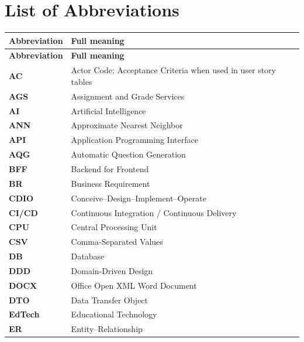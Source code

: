 \chapter*{List of Abbreviations}
{}

\begin{longtable}{|p{3.5cm}|p{11cm}|}
    \hline
    \textbf{Abbreviation} & \textbf{Full meaning} \\
    \hline
    \endfirsthead
    \hline
    \textbf{Abbreviation} & \textbf{Full meaning} \\
    \hline
    \endhead

    \textbf{AC}      & Actor Code; Acceptance Criteria when used in user story tables \\
    \hline
    \textbf{AGS}     & Assignment and Grade Services \\
    \hline
    \textbf{AI}      & Artificial Intelligence \\
    \hline
    \textbf{ANN}     & Approximate Nearest Neighbor \\
    \hline
    \textbf{API}     & Application Programming Interface \\
    \hline
    \textbf{AQG}     & Automatic Question Generation \\
    \hline
    \textbf{BFF}     & Backend for Frontend \\
    \hline
    \textbf{BR}      & Business Requirement \\
    \hline
    \textbf{CDIO}    & Conceive--Design--Implement--Operate \\
    \hline
    \textbf{CI/CD}   & Continuous Integration / Continuous Delivery \\
    \hline
    \textbf{CPU}     & Central Processing Unit \\
    \hline
    \textbf{CSV}     & Comma-Separated Values \\
    \hline
    \textbf{DB}      & Database \\
    \hline
    \textbf{DDD}     & Domain-Driven Design \\
    \hline
    \textbf{DOCX}    & Office Open XML Word Document \\
    \hline
    \textbf{DTO}     & Data Transfer Object \\
    \hline
    \textbf{EdTech}  & Educational Technology \\
    \hline
    \textbf{ER}      & Entity--Relationship \\
    \hline

\end{longtable}

